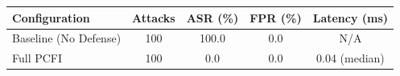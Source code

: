 \begin{tabular}{l c c c c}
\toprule
\textbf{Configuration} & \textbf{Attacks} & \textbf{ASR (\%)} & \textbf{FPR (\%)} & \textbf{Latency (ms)} \\
\midrule
Baseline (No Defense) & 100 & 100.0 & 0.0 & N/A \\
Full PCFI & 100 & 0.0 & 0.0 & 0.04 (median) \\
\bottomrule
\end{tabular}

